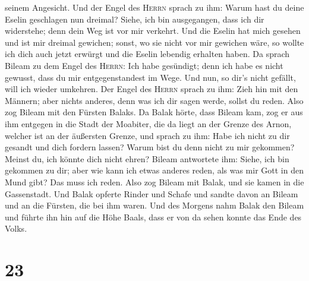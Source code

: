 seinem Angesicht.  Und der Engel des \textsc{Herrn}
sprach zu ihm: Warum hast du deine Eselin geschlagen nun dreimal? Siehe,
ich bin ausgegangen, dass ich dir widerstehe; denn dein Weg ist vor mir
verkehrt.  Und die Eselin hat mich gesehen und ist mir
dreimal gewichen; sonst, wo sie nicht vor mir gewichen wäre, so wollte
ich dich auch jetzt erwürgt und die Eselin lebendig erhalten haben.
 Da sprach Bileam zu dem Engel des \textsc{Herrn}: Ich
habe gesündigt; denn ich habe es nicht gewusst, dass du mir
entgegenstandest im Wege. Und nun, so dir's nicht gefällt, will ich
wieder umkehren.  Der Engel des \textsc{Herrn} sprach zu
ihm: Zieh hin mit den Männern; aber nichts anderes, denn was ich dir
sagen werde, sollst du reden. Also zog Bileam mit den Fürsten Balaks.
 Da Balak hörte, dass Bileam kam, zog er aus ihm entgegen
in die Stadt der Moabiter, die da liegt an der Grenze des Arnon, welcher
ist an der äußersten Grenze,  und sprach zu ihm: Habe ich
nicht zu dir gesandt und dich fordern lassen? Warum bist du denn nicht
zu mir gekommen? Meinst du, ich könnte dich nicht ehren? 
Bileam antwortete ihm: Siehe, ich bin gekommen zu dir; aber wie kann ich
etwas anderes reden, als was mir Gott in den Mund gibt? Das muss ich
reden.  Also zog Bileam mit Balak, und sie kamen in die
Gassenstadt.  Und Balak opferte Rinder und Schafe und
sandte davon an Bileam und an die Fürsten, die bei ihm waren.
 Und des Morgens nahm Balak den Bileam und führte ihn hin
auf die Höhe Baals, dass er von da sehen konnte das Ende des Volks.

\hypertarget{section-22}{%
\section{23}\label{section-22}}

